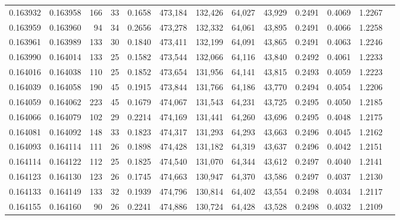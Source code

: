 \begin{tabular}{rrrrrrrrrrrrr}
0.163932 & 0.163958 &   166 &  33 &                                     0.1658 & 473,184 & 132,426 &  64,027 &  43,929 & 0.2491 & 0.4069 & 1.2267 \\
0.163959 & 0.163960 &    94 &  34 &                                     0.2656 & 473,278 & 132,332 &  64,061 &  43,895 & 0.2491 & 0.4066 & 1.2258 \\
0.163961 & 0.163989 &   133 &  30 &                                     0.1840 & 473,411 & 132,199 &  64,091 &  43,865 & 0.2491 & 0.4063 & 1.2246 \\
0.163990 & 0.164014 &   133 &  25 &                                     0.1582 & 473,544 & 132,066 &  64,116 &  43,840 & 0.2492 & 0.4061 & 1.2233 \\
0.164016 & 0.164038 &   110 &  25 &                                     0.1852 & 473,654 & 131,956 &  64,141 &  43,815 & 0.2493 & 0.4059 & 1.2223 \\
0.164039 & 0.164058 &   190 &  45 &                                     0.1915 & 473,844 & 131,766 &  64,186 &  43,770 & 0.2494 & 0.4054 & 1.2206 \\
0.164059 & 0.164062 &   223 &  45 &                                     0.1679 & 474,067 & 131,543 &  64,231 &  43,725 & 0.2495 & 0.4050 & 1.2185 \\
0.164066 & 0.164079 &   102 &  29 &                                     0.2214 & 474,169 & 131,441 &  64,260 &  43,696 & 0.2495 & 0.4048 & 1.2175 \\
0.164081 & 0.164092 &   148 &  33 &                                     0.1823 & 474,317 & 131,293 &  64,293 &  43,663 & 0.2496 & 0.4045 & 1.2162 \\
0.164093 & 0.164114 &   111 &  26 &                                     0.1898 & 474,428 & 131,182 &  64,319 &  43,637 & 0.2496 & 0.4042 & 1.2151 \\
0.164114 & 0.164122 &   112 &  25 &                                     0.1825 & 474,540 & 131,070 &  64,344 &  43,612 & 0.2497 & 0.4040 & 1.2141 \\
0.164123 & 0.164130 &   123 &  26 &                                     0.1745 & 474,663 & 130,947 &  64,370 &  43,586 & 0.2497 & 0.4037 & 1.2130 \\
0.164133 & 0.164149 &   133 &  32 &                                     0.1939 & 474,796 & 130,814 &  64,402 &  43,554 & 0.2498 & 0.4034 & 1.2117 \\
0.164155 & 0.164160 &    90 &  26 &                                     0.2241 & 474,886 & 130,724 &  64,428 &  43,528 & 0.2498 & 0.4032 & 1.2109 \\

\end{tabular}
